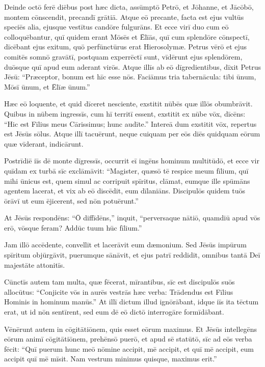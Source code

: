\Versus Deinde octō ferē diēbus post hæc dicta, assūmptō Petrō, et Jōhanne, et Jācōbō, montem cōnscendit, precandī grātiā.
\Versus Atque eō precante, facta est ejus vultūs speciēs alia, ejusque vestītus candōre fulgurāns.
\Versus Et ecce virī duo cum eō colloquēbantur, quī quidem erant Mōsēs et Ēlīās,
\Versus quī cum splendōre cōnspectī, dīcēbant ejus exitum, quō perfūnctūrus erat Hierosolymæ.
\Versus Petrus vērō et ejus comitēs somnō gravātī, postquam experrēctī sunt, vīdērunt ejus splendōrem, duōsque quī apud eum aderant virōs.
\Versus Atque illīs ab eō dīgredientibus, dīxit Petrus Jēsū: ``Præceptor, bonum est hīc esse nōs. Faciāmus tria tabernācula: tibi ūnum, Mōsī ūnum, et Ēlīæ ūnum.''

\Versus Hæc eō loquente, et quid dīceret nesciente, exstitit nūbēs quæ illōs obumbrāvit. Quibus in nūbem ingressīs, cum hī territī essent,
\Versus exstitit ex nūbe vōx, dīcēns: ``Hic est Fīlius meus Cārissimus; hunc audīte.''
\Versus Intereā dum exstitit vōx, repertus est Jēsūs sōlus. Atque illī tacuērunt, neque cuiquam per eōs diēs quidquam eōrum quæ vīderant, indicārunt.

\Versus Postrīdiē iīs dē monte dīgressīs, occurrit eī ingēns hominum multitūdō,
\Versus et ecce vir quīdam ex turbā sīc exclāmāvit: ``Magister, quæsō tē respice meum fīlium, quī mihi ūnicus est,
\Versus quem simul ac corripuit spīritus, clāmat, eumque ille spūmāns agentem lacerat, et vix ab eō discēdit, eum dīlaniāns.
\Versus Discipulōs quidem tuōs ōrāvī ut eum ējicerent, sed nōn potuērunt.''

\Versus At Jēsūs respondēns: ``Ō diffīdēns,'' inquit, ``perversaque nātiō, quamdiū apud vōs erō, vōsque feram? Addūc tuum hūc fīlium.''

\Versus Jam illō accēdente, convellit et lacerāvit eum dæmonium. Sed Jēsūs impūrum spīritum objūrgāvit, puerumque sānāvit, et ejus patrī reddidit, omnibus tantā Deī majestāte attonitīs.

\Versus Cūnctīs autem tam multa, quæ fēcerat, mīrantibus, sīc est discipulōs suōs allocūtus:
\Versus ``Conjicite vōs in aurēs vestrās hæc verba: Trādendus est Fīlius Hominis in hominum manūs.''
\Versus At illī dictum illud ignōrābant, idque iīs ita tēctum erat, ut id nōn sentīrent, sed eum dē eō dictō interrogāre formīdābant.

\Versus Vēnērunt autem in cōgitātiōnem, quis esset eōrum maximus.
\Versus Et Jēsūs intellegēns eōrum animī cōgitātiōnem, prehēnsō puerō, et apud sē statūtō, sīc ad eōs verba fēcit:
\Versus ``Quī puerum hunc meō nōmine accipit, mē accipit, et quī mē accipit, eum accipit quī mē mīsit. Nam vestrum minimus quisque, maximus erit.''

